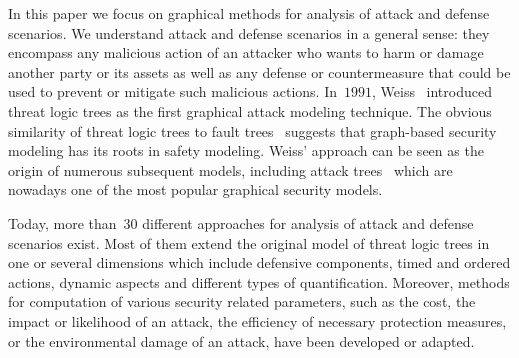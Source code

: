 \documentclass[a4paper]{article}
\begin{document}
In this paper we focus on graphical methods for analysis of attack and defense 
scenarios. We understand attack and defense scenarios in a general sense: they
encompass any malicious action of an attacker who wants to harm or damage 
another party or its assets as well as any defense or countermeasure that could
be used to prevent or mitigate such malicious actions. In~$1991$,
Weiss~\cite{Weis} introduced threat logic trees as the first graphical attack
modeling technique. The obvious similarity of threat logic trees to fault
trees~\cite{VeGoRoHa} suggests that graph-based security modeling has its roots
in safety modeling. Weiss' approach can be seen as the origin of numerous
subsequent models, including attack trees~\cite{SaSaScWa,Schn} 
which are nowadays one of the most popular graphical security models. 

Today, more than~$30$ different approaches for analysis of attack and defense
scenarios exist. Most of them extend the original model of threat logic trees in
one or several dimensions which include defensive components, timed and ordered
actions, dynamic aspects and different types of quantification. Moreover,
methods for computation of various security related parameters, such as the
cost, the impact or likelihood of an attack, the efficiency of necessary
protection measures, or the environmental damage of an attack, have been
developed or adapted. 
\end{document}

